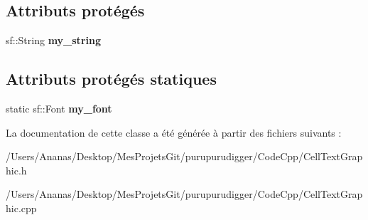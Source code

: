 \subsection*{Attributs protégés}
\begin{DoxyCompactItemize}
\item 
\hypertarget{class_cell_text_graphic_ad701261feb308e2da626479a5f746515}{sf\-::\-String {\bfseries my\-\_\-string}}\label{class_cell_text_graphic_ad701261feb308e2da626479a5f746515}

\end{DoxyCompactItemize}
\subsection*{Attributs protégés statiques}
\begin{DoxyCompactItemize}
\item 
\hypertarget{class_cell_text_graphic_aa2ec7dc0bd72bbc7329cee2f17303405}{static sf\-::\-Font {\bfseries my\-\_\-font}}\label{class_cell_text_graphic_aa2ec7dc0bd72bbc7329cee2f17303405}

\end{DoxyCompactItemize}


La documentation de cette classe a été générée à partir des fichiers suivants \-:\begin{DoxyCompactItemize}
\item 
/\-Users/\-Ananas/\-Desktop/\-Mes\-Projets\-Git/purupurudigger/\-Code\-Cpp/Cell\-Text\-Graphic.\-h\item 
/\-Users/\-Ananas/\-Desktop/\-Mes\-Projets\-Git/purupurudigger/\-Code\-Cpp/Cell\-Text\-Graphic.\-cpp\end{DoxyCompactItemize}
